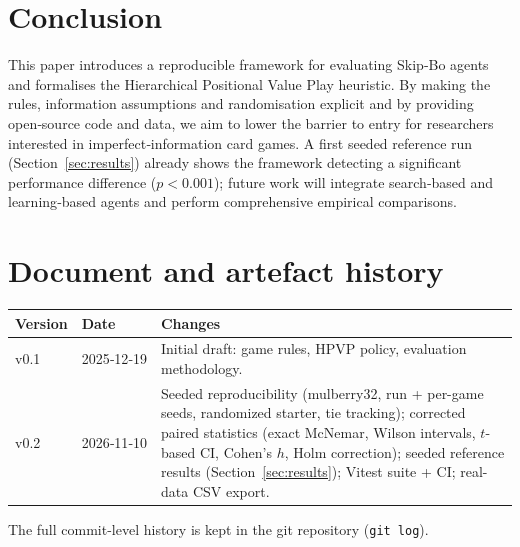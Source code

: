\documentclass[11pt]{article}
\begin{document}
\section{Conclusion}
This paper introduces a reproducible framework for evaluating Skip‑Bo agents and formalises the Hierarchical Positional Value Play heuristic. By making the rules, information assumptions and randomisation explicit and by providing open‑source code and data, we aim to lower the barrier to entry for researchers interested in imperfect‑information card games. A first seeded reference run (Section~\ref{sec:results}) already shows the framework detecting a significant performance difference ($p<0.001$); future work will integrate search‑based and learning‑based agents and perform comprehensive empirical comparisons.


\section*{Document and artefact history}
\label{sec:history}
\begin{tabular}{@{}l l p{}@{}}
\toprule
\textbf{Version} & \textbf{Date} & \textbf{Changes} \\
\midrule
v0.1 & 2025‑12‑19 & Initial draft: game rules, HPVP policy, evaluation methodology. \\
v0.2 & 2026‑11‑10 & Seeded reproducibility (mulberry32, run + per-game seeds, randomized starter, tie tracking); corrected paired statistics (exact McNemar, Wilson intervals, $t$-based CI, Cohen's $h$, Holm correction); seeded reference results (Section~\ref{sec:results}); Vitest suite + CI; real-data CSV export. \\
\bottomrule
\end{tabular}

The full commit-level history is kept in the git repository (\texttt{git log}).
\end{document}
